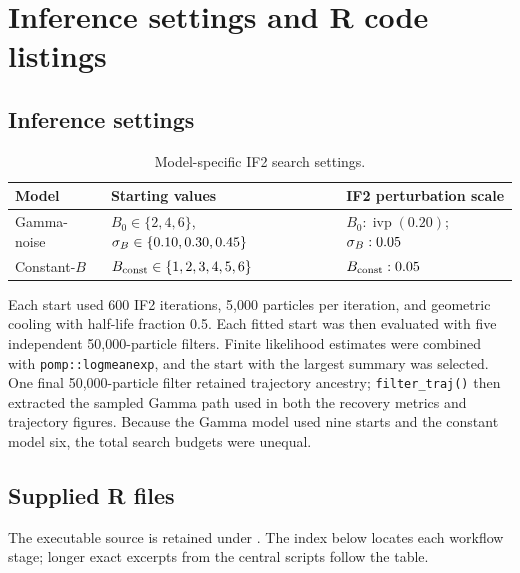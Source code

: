 \section{Inference settings and R code listings}
\label{app:implementation}
\label{app:code}

\subsection{Inference settings}

\begin{table}[htbp]
\centering
\small
\caption{Model-specific IF2 search settings.}
\begin{tabularx}{0.95\textwidth}{
  >{\raggedright\arraybackslash}p{}
  >{\raggedright\arraybackslash}p{}
  X}
\toprule
Model & Starting values & IF2 perturbation scale \\
\midrule
Gamma-noise
& \(B_0\in\{2,4,6\}\),
\(\sigma_B\in\{0.10,0.30,0.45\}\)
& \(B_0:\operatorname{ivp}(0.20)\);
\(\sigma_B:0.05\) \\
Constant-\(B\)
& \(B_{\mathrm{const}}\in\{1,2,3,4,5,6\}\)
& \(B_{\mathrm{const}}:0.05\) \\
\bottomrule
\end{tabularx}
\end{table}

Each start used 600 IF2 iterations, 5,000 particles per iteration, and
geometric cooling with half-life fraction 0.5.  Each fitted start was then
evaluated with five independent 50,000-particle filters.  Finite likelihood
estimates were combined with \texttt{pomp::logmeanexp}, and the start with the
largest summary was selected.  One final 50,000-particle filter retained
trajectory ancestry; \texttt{filter\_traj()} then extracted the sampled Gamma
path used in both the recovery metrics and trajectory figures.
Because the Gamma model used nine starts and the constant model six, the total
search budgets were unequal.

\subsection{Supplied R files}

The executable source is retained under
.  The index below locates each workflow stage;
longer exact excerpts from the central scripts follow the table.

